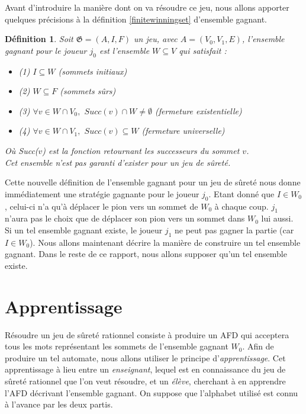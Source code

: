\documentclass[12pt,a4paper,oneside,titlepage]{report}
\newtheorem{defi}{D\'efinition}[section]
\begin{document}
Avant d'introduire la manière dont on va résoudre ce jeu, nous allons apporter quelques précisions à la définition \ref{finitewinningset} d'ensemble gagnant.
\begin{defi}
\label{infinitewinningset}
Soit $\mathfrak{G}=(A,I,F)$ un jeu, avec $A=(V_0, V_1, E)$, l'\emph{ensemble gagnant} pour le joueur $j_0$ est l'ensemble $W\subseteq V$ qui satisfait :
\begin{itemize}
\item (1) $I\subseteq W$ (\emph{sommets initiaux})
\item (2) $W\subseteq F$ (\emph{sommets sûrs})
\item (3) $\forall v\in W\cap V_0,$ $Succ(v)\cap W\neq\emptyset$ (\emph{fermeture existentielle})
\item (4) $\forall v\in W\cap V_1,$ $Succ(v)\subseteq W$ (\emph{fermeture universelle})
\end{itemize}
Où \emph{Succ($v$)} est la fonction retournant les successeurs du sommet $v$.\\
Cet ensemble n'est pas garanti d'exister pour un jeu de sûreté.
\end{defi}
Cette nouvelle définition de l'ensemble gagnant pour un jeu de sûreté nous donne immédiatement une stratégie gagnante pour le joueur $j_0$. Etant donné que $I\in W_0$, celui-ci n'a qu'à déplacer le pion vers un sommet de $W_0$ à chaque coup. $j_1$ n'aura pas le choix que de déplacer son pion vers un sommet dans $W_0$ lui aussi.\\

\noindent Si un tel ensemble gagnant existe, le joueur $j_1$ ne peut pas gagner la partie (car $I\in W_0$). Nous allons maintenant décrire la manière de construire un tel ensemble gagnant. Dans le reste de ce rapport, nous allons supposer qu'un tel ensemble existe.\\


\section{Apprentissage}\label{sectionapprentissage}
Résoudre un jeu de sûreté rationnel consiste à produire un AFD qui acceptera tous les mots représentant les sommets de l'ensemble gagnant $W_0$. Afin de produire un tel automate, nous allons utiliser le principe d'\emph{apprentissage}. Cet apprentissage à lieu entre un \emph{enseignant}, lequel est en connaissance du jeu de sûreté rationnel que l'on veut résoudre, et un \emph{élève}, cherchant à en apprendre l'AFD décrivant l'ensemble gagnant. On suppose que l'alphabet utilisé est connu à l'avance par les deux partis.\\
\end{document}
